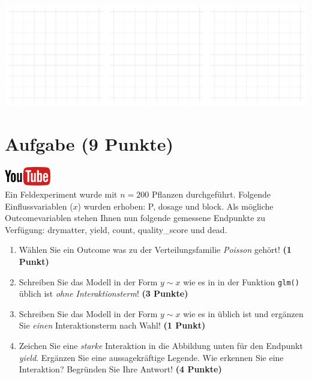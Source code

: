 \documentclass[a4paper, 10pt]{scrartcl}\usepackage[]{graphicx}\usepackage[]{xcolor}
\makeatletter
\def\maxwidth{ %
  \ifdim\Gin@nat@width>\linewidth
    \linewidth
  \else
    \Gin@nat@width
  \fi
}
\makeatother
\begin{document}
{\centering \includegraphics[width=\maxwidth]{img/regression-01-1} 

}



 
\clearpage

\section{Aufgabe \hfill (9 Punkte)}

\hfill\href{https://youtu.be/AwQEcQWLFCw}{\includegraphics[width =
  2cm]{img/youtube}}\\[1Ex]



Ein Feldexperiment wurde mit $n = 200$ Pflanzen durchgef{\"u}hrt. Folgende
Einflussvariablen ($x$) wurden erhoben: P, dosage und block. Als m{\"o}gliche Outcomevariablen stehen Ihnen nun
folgende gemessene Endpunkte zu Verf{\"u}gung: drymatter, yield, count, quality\_score und dead.

\begin{enumerate}
\item W{\"a}hlen Sie ein Outcome was zu der Verteilungsfamilie
  \textit{Poisson} geh{\"o}rt! \textbf{(1 Punkt)}
\item Schreiben Sie das Modell in der Form $y \sim x$ wie es in \Rlogo in
  der Funktion \texttt{glm()}
  {\"u}blich ist \textit{ohne Interaktionsterm}! \textbf{(3 Punkte)}
\item Schreiben Sie das Modell in der Form $y \sim x$ wie es in \Rlogo
  {\"u}blich ist und erg{\"a}nzen Sie \textit{einen} Interaktionsterm nach Wahl! \textbf{(1 Punkt)} 
\item Zeichen Sie eine \textit{starke}
  Interaktion in die Abbildung unten f{\"u}r den Endpunkt
  \textit{yield}. Erg{\"a}nzen Sie eine aussagekr{\"a}ftige Legende. Wie erkennen
  Sie eine Interaktion? Begr{\"u}nden Sie Ihre Antwort! \textbf{(4 Punkte)}
\end{enumerate}
\end{document}
